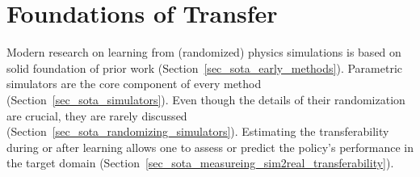 \documentclass[utf8]{frontiersSCNS} %
\begin{document}
\section{Foundations of \SimtoReal Transfer}
\label{sec_sota_simtoreal_foundations}
Modern research on learning from (randomized) physics simulations is based on solid foundation of prior work (Section~\ref{sec_sota_early_methods}).
Parametric simulators are the core component of every \simtoreal method (Section~\ref{sec_sota_simulators}).
Even though the details of their randomization are crucial, they are rarely discussed (Section~\ref{sec_sota_randomizing_simulators}).
Estimating the \simtoreal transferability during or after learning allows one to assess or predict the policy's performance in the target domain (Section~\ref{sec_sota_measureing_sim2real_transferability}).

\end{document}
